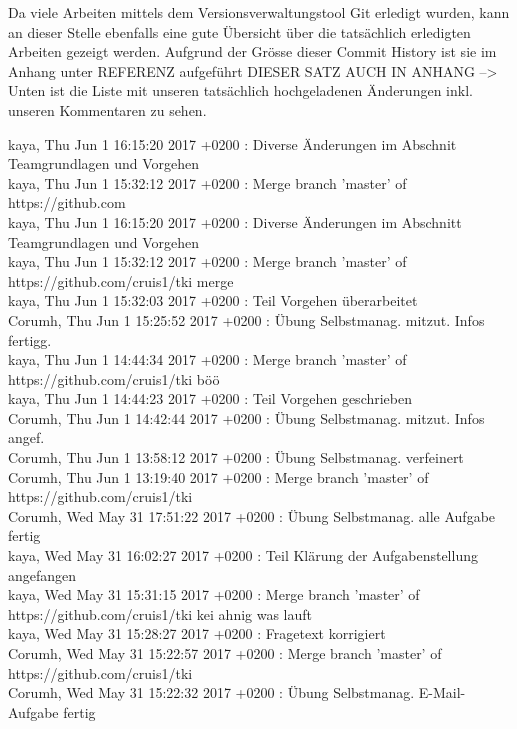 Da viele Arbeiten mittels dem Versionsverwaltungstool Git erledigt wurden, kann an dieser Stelle ebenfalls eine gute Übersicht über die tatsächlich erledigten Arbeiten gezeigt werden. Aufgrund der Grösse dieser Commit History ist sie im Anhang unter REFERENZ aufgeführt DIESER SATZ AUCH IN ANHANG --> Unten ist die Liste mit unseren tatsächlich hochgeladenen Änderungen inkl. unseren Kommentaren zu sehen.


kaya, Thu Jun 1 16:15:20 2017 +0200 : Diverse Änderungen im Abschnit Teamgrundlagen und Vorgehen\\
kaya, Thu Jun 1 15:32:12 2017 +0200 : Merge branch 'master' of https://github.com\\
kaya, Thu Jun 1 16:15:20 2017 +0200 : Diverse Änderungen im Abschnitt Teamgrundlagen und Vorgehen\\
kaya, Thu Jun 1 15:32:12 2017 +0200 : Merge branch 'master' of https://github.com/cruis1/tki merge\\
kaya, Thu Jun 1 15:32:03 2017 +0200 : Teil Vorgehen überarbeitet\\
Corumh, Thu Jun 1 15:25:52 2017 +0200 : Übung Selbstmanag. mitzut. Infos fertigg.\\
kaya, Thu Jun 1 14:44:34 2017 +0200 : Merge branch 'master' of https://github.com/cruis1/tki böö\\
kaya, Thu Jun 1 14:44:23 2017 +0200 : Teil Vorgehen geschrieben\\
Corumh, Thu Jun 1 14:42:44 2017 +0200 : Übung Selbstmanag. mitzut. Infos angef.\\
Corumh, Thu Jun 1 13:58:12 2017 +0200 : Übung Selbstmanag. verfeinert\\
Corumh, Thu Jun 1 13:19:40 2017 +0200 : Merge branch 'master' of https://github.com/cruis1/tki\\
Corumh, Wed May 31 17:51:22 2017 +0200 : Übung Selbstmanag. alle Aufgabe fertig\\
kaya, Wed May 31 16:02:27 2017 +0200 : Teil Klärung der Aufgabenstellung angefangen\\
kaya, Wed May 31 15:31:15 2017 +0200 : Merge branch 'master' of https://github.com/cruis1/tki kei ahnig was lauft\\
kaya, Wed May 31 15:28:27 2017 +0200 : Fragetext korrigiert\\
Corumh, Wed May 31 15:22:57 2017 +0200 : Merge branch 'master' of https://github.com/cruis1/tki\\
Corumh, Wed May 31 15:22:32 2017 +0200 : Übung Selbstmanag. E-Mail-Aufgabe fertig\\
